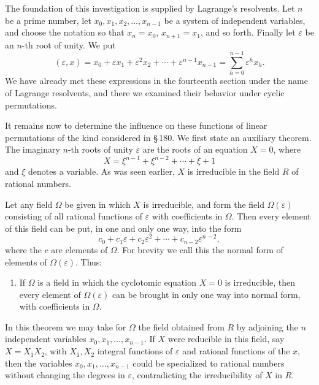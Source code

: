 \documentclass[11pt]{article}
\begin{document}
The foundation of this investigation is supplied by Lagrange's resolvents. Let $n$ be a prime number, let $x_0,x_1,x_2,\ldots,x_{n-1}$ be a system of independent variables, and choose the notation so that $x_n=x_0$, $x_{n+1}=x_1$, and so forth. Finally let $\varepsilon$ be an $n$-th root of unity. We put
\begin{equation}\tag{1}
  (\varepsilon,x)=x_0+\varepsilon x_1+\varepsilon^2x_2+\cdots+\varepsilon^{n-1}x_{n-1}
  =\sum_{h=0}^{n-1}\varepsilon^h x_h .
\end{equation}
We have already met these expressions in the fourteenth section under the name of Lagrange resolvents, and there we examined their behavior under cyclic permutations.

It remains now to determine the influence on these functions of linear permutations of the kind considered in \S\,180. We first state an auxiliary theorem. The imaginary $n$-th roots of unity $\varepsilon$ are the roots of an equation $X=0$, where
\begin{equation}\tag{2}
  X=\xi^{n-1}+\xi^{n-2}+\cdots+\xi+1
\end{equation}
and $\xi$ denotes a variable. As was seen earlier, $X$ is irreducible in the field $R$ of rational numbers.

Let any field $\Omega$ be given in which $X$ is irreducible, and form the field $\Omega(\varepsilon)$ consisting of all rational functions of $\varepsilon$ with coefficients in $\Omega$. Then every element of this field can be put, in one and only one way, into the form
\begin{equation}\tag{3}
  c_0+c_1\varepsilon+c_2\varepsilon^2+\cdots+c_{n-2}\varepsilon^{n-2},
\end{equation}
where the $c$ are elements of $\Omega$. For brevity we call this the normal form of elements of $\Omega(\varepsilon)$. Thus:

\begin{enumerate}[label=\arabic*.]
\item If $\Omega$ is a field in which the cyclotomic equation $X=0$ is irreducible, then every element of $\Omega(\varepsilon)$ can be brought in only one way into normal form, with coefficients in $\Omega$.
\end{enumerate}

In this theorem we may take for $\Omega$ the field obtained from $R$ by adjoining the $n$ independent variables $x_0,x_1,\ldots,x_{n-1}$. If $X$ were reducible in this field, say $X=X_1X_2$, with $X_1,X_2$ integral functions of $\varepsilon$ and rational functions of the $x$, then the variables $x_0,x_1,\ldots,x_{n-1}$ could be specialized to rational numbers without changing the degrees in $\varepsilon$, contradicting the irreducibility of $X$ in $R$.
\end{document}
